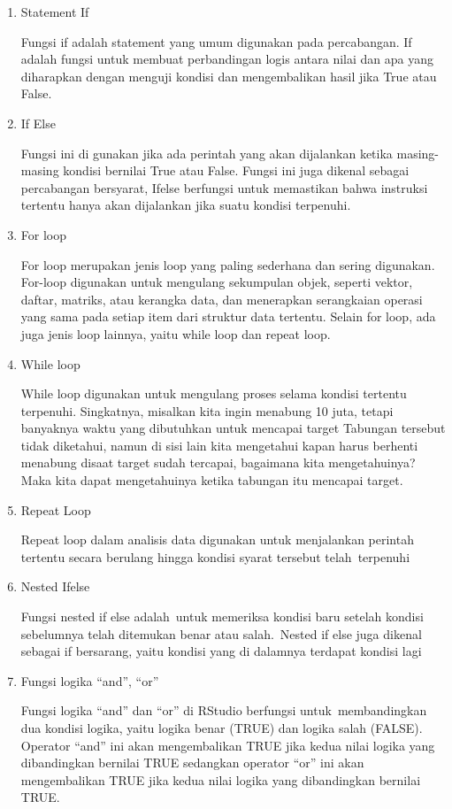 \documentclass[
]{article}
\begin{document}
\begin{enumerate}
\def\labelenumi{\arabic{enumi}.}
\item
  Statement If

  Fungsi if adalah statement yang umum digunakan pada percabangan. If
  adalah fungsi untuk membuat perbandingan logis antara nilai dan apa
  yang diharapkan dengan menguji kondisi dan mengembalikan hasil jika
  True atau False.
\item
  If Else

  Fungsi ini di gunakan jika ada perintah yang akan dijalankan ketika
  masing-masing kondisi bernilai True atau False. Fungsi ini juga
  dikenal sebagai percabangan bersyarat, Ifelse berfungsi untuk
  memastikan bahwa instruksi tertentu hanya akan dijalankan jika suatu
  kondisi terpenuhi.
\item
  For loop

  For loop merupakan jenis loop yang paling sederhana dan sering
  digunakan. For-loop digunakan untuk mengulang sekumpulan objek,
  seperti vektor, daftar, matriks, atau kerangka data, dan menerapkan
  serangkaian operasi yang sama pada setiap item dari struktur data
  tertentu. Selain for loop, ada juga jenis loop lainnya, yaitu while
  loop dan repeat loop.
\item
  While loop

  While loop digunakan untuk mengulang proses selama kondisi tertentu
  terpenuhi. Singkatnya, misalkan kita ingin menabung 10 juta, tetapi
  banyaknya waktu yang dibutuhkan untuk mencapai target Tabungan
  tersebut tidak diketahui, namun di sisi lain kita mengetahui kapan
  harus berhenti menabung disaat target sudah tercapai, bagaimana kita
  mengetahuinya? Maka kita dapat mengetahuinya ketika tabungan itu
  mencapai target.
\item
  Repeat Loop

  Repeat loop dalam analisis data digunakan untuk menjalankan perintah
  tertentu secara berulang hingga kondisi syarat tersebut
  telah~terpenuhi
\item
  Nested Ifelse

  Fungsi nested if else adalah~untuk memeriksa kondisi baru setelah
  kondisi sebelumnya telah ditemukan benar atau salah.~Nested if else
  juga dikenal sebagai if bersarang, yaitu kondisi yang di dalamnya
  terdapat kondisi lagi
\item
  Fungsi logika ``and'', ``or''

  Fungsi logika ``and'' dan ``or'' di RStudio berfungsi
  untuk~membandingkan dua kondisi logika, yaitu logika benar (TRUE) dan
  logika salah (FALSE). Operator ``and'' ini akan mengembalikan TRUE
  jika kedua nilai logika yang dibandingkan bernilai TRUE sedangkan
  operator ``or'' ini akan mengembalikan TRUE jika kedua nilai logika
  yang dibandingkan bernilai TRUE.
\end{enumerate}
\end{document}
